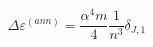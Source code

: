 \begin{equation}
\Delta \varepsilon ^{\left( ann\right) }=\frac{\alpha ^{4}m}{4}\frac{1}{n^{3}%
}\delta _{J,1}
\end{equation}

